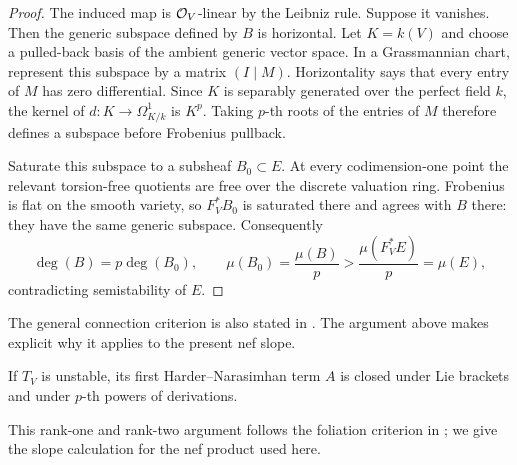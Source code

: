 \begin{proof}
The induced map is $\mathcal O_V$-linear by the Leibniz rule.  Suppose it vanishes.
Then the generic subspace defined by $B$ is horizontal.  Let $K=k(V)$ and
choose a pulled-back basis of the ambient generic vector space.  In a
Grassmannian chart, represent this subspace by a matrix $(I\mid M)$.
Horizontality says that every entry of $M$ has zero differential.  Since
$K$ is separably generated over the perfect field $k$, the kernel of
$d\colon K\to\Omega_{K/k}^1$ is $K^p$.  Taking $p$-th roots of the entries
of $M$ therefore defines a subspace before Frobenius pullback.

Saturate this subspace to a subsheaf $B_0\subset E$.  At every
codimension-one point the relevant torsion-free quotients are free over
the discrete valuation ring.  Frobenius is flat on the smooth variety,
so $F_V^*B_0$ is saturated there and agrees with $B$ there: they have the
same generic subspace.  Consequently
\[
  \deg(B)=p\deg(B_0),\qquad
  \mu(B_0)=\frac{\mu(B)}p>
  \frac{\mu(F_V^*E)}p=\mu(E),
\]
contradicting semistability of $E$.
\end{proof}

The general connection criterion is also stated in
\cite[Corollary~2.4]{langer2004}.  The argument above makes explicit why
it applies to the present nef slope.

\begin{lemma}
\label{lem:destabilizing-foliation}
If $T_V$ is unstable, its first Harder--Narasimhan term $A$ is closed under
Lie brackets and under $p$-th powers of derivations.
\end{lemma}

This rank-one and rank-two argument follows the foliation criterion in
\cite[Lemma~2.9]{xuzhang2019}; we give the slope calculation for the
nef product used here.

